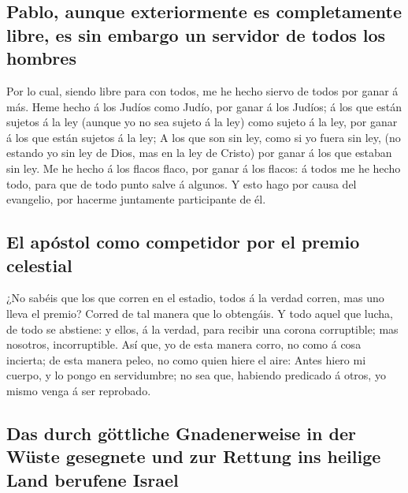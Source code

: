 \hypertarget{pablo-aunque-exteriormente-es-completamente-libre-es-sin-embargo-un-servidor-de-todos-los-hombres}{%
\subsection{Pablo, aunque exteriormente es completamente libre, es sin
embargo un servidor de todos los
hombres}\label{pablo-aunque-exteriormente-es-completamente-libre-es-sin-embargo-un-servidor-de-todos-los-hombres}}

 Por lo cual, siendo libre para con todos, me he hecho
siervo de todos por ganar á más.  Heme hecho á los Judíos
como Judío, por ganar á los Judíos; á los que están sujetos á la ley
(aunque yo no sea sujeto á la ley) como sujeto á la ley, por ganar á los
que están sujetos á la ley;  A los que son sin ley, como
si yo fuera sin ley, (no estando yo sin ley de Dios, mas en la ley de
Cristo) por ganar á los que estaban sin ley.  Me he hecho
á los flacos flaco, por ganar á los flacos: á todos me he hecho todo,
para que de todo punto salve á algunos.  Y esto hago por
causa del evangelio, por hacerme juntamente participante de él.

\hypertarget{el-apuxf3stol-como-competidor-por-el-premio-celestial}{%
\subsection{El apóstol como competidor por el premio
celestial}\label{el-apuxf3stol-como-competidor-por-el-premio-celestial}}

 ¿No sabéis que los que corren en el estadio, todos á la
verdad corren, mas uno lleva el premio? Corred de tal manera que lo
obtengáis.  Y todo aquel que lucha, de todo se abstiene:
y ellos, á la verdad, para recibir una corona corruptible; mas nosotros,
incorruptible.  Así que, yo de esta manera corro, no como
á cosa incierta; de esta manera peleo, no como quien hiere el aire:
 Antes hiero mi cuerpo, y lo pongo en servidumbre; no sea
que, habiendo predicado á otros, yo mismo venga á ser reprobado.

\hypertarget{das-durch-guxf6ttliche-gnadenerweise-in-der-wuxfcste-gesegnete-und-zur-rettung-ins-heilige-land-berufene-israel}{%
\subsection{Das durch göttliche Gnadenerweise in der Wüste gesegnete und
zur Rettung ins heilige Land berufene
Israel}\label{das-durch-guxf6ttliche-gnadenerweise-in-der-wuxfcste-gesegnete-und-zur-rettung-ins-heilige-land-berufene-israel}}

